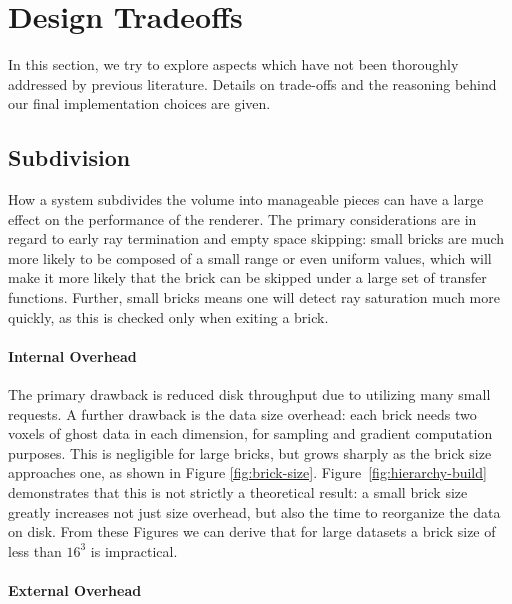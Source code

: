 \section{Design Tradeoffs}
\label{sec:tradeoffs}

In this section, we try to explore aspects which have not been
thoroughly addressed by previous literature.  Details on trade-offs and
the reasoning behind our final implementation choices are given.


\subsection{Subdivision}
\label{sec:subdivision}

How a system subdivides the volume into manageable pieces can have
a large effect on the performance of the renderer.  The primary
considerations are in regard to early ray termination and empty space
skipping: small bricks are much more likely to be composed of a small
range or even uniform values, which will make it more likely that the
brick can be skipped under a large set of transfer functions.  Further,
small bricks means one will detect ray saturation much more quickly, as
this is checked only when exiting a brick.

\paragraph{Internal Overhead}

The primary drawback is reduced disk throughput due to utilizing many
small requests.  A further drawback is the data size overhead: each
brick needs two voxels of ghost data in each dimension, for sampling
and gradient computation purposes.  This is negligible for large
bricks, but grows sharply as the brick size approaches one, as shown in
Figure
\ref{fig:brick-size}. Figure~\ref{fig:hierarchy-build} demonstrates
that this is not strictly a theoretical result: a small brick size
greatly increases not just size overhead, but also the time to
reorganize the data on disk.  From these Figures we can derive that for
large datasets a brick size of less than $16^3$ is impractical.

\paragraph{External Overhead}

